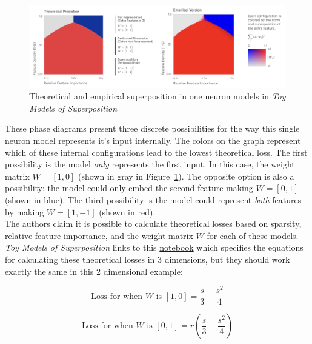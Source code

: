 \documentclass{article} %
\begin{document}
\begin{figure}[h]
    \centering
    \includegraphics[width=0.99\linewidth]{phase_changes/images/phase_changes_anthropic.png}
    \captionsetup{font=footnotesize, width=0.7\linewidth} %
    \caption{
        Theoretical and empirical superposition in one neuron models in 
        \textit{Toy Models of Superposition}\cite{elhage2022toy}
    }
    \label{fig:section4_anthropic}
\end{figure}

These phase diagrams present three discrete possibilities for the way this single
neuron model represents it's input internally. The colors on the graph represent
which of these internal configurations lead to the lowest theoretical loss.
The first possibility is the model 
\textit{only} represents the first input. In this case, the weight matrix $W = [1, 0]$ (shown in
gray in Figure~\ref{fig:section4_anthropic}). The opposite option is also a 
possibility: the model could only embed the second feature making $W = [0, 1]$ 
(shown in blue). The third possibility is the model could represent \textit{both}
features by making $W = [1, -1]$ (shown in red). \\

The authors claim it is possible to calculate theoretical losses based on sparsity,
relative feature importance, and the weight matrix $W$ for each of these models. 
\textit{Toy Models of Superposition} links to this 
\href{https://github.com/wattenberg/superposition/blob/main/Exploring_Exact_Toy_Models.ipynb}{notebook} 
which specifies the equations for calculating these theoretical losses in 3 
dimensions, but they should work exactly the same in this 2 dimensional example:

\begin{equation}
    \label{eq:loss1}
    \text{Loss for when  $W$ is $[1, 0]$} = \frac{s}{3} - \frac{s^2}{4}
\end{equation}

\begin{equation}
    \label{eq:loss2}
    \text{Loss for when  $W$ is $[0, 1]$} = r \left(\frac{s}{3} - \frac{s^2}{4}\right)
\end{equation}
\end{document}

